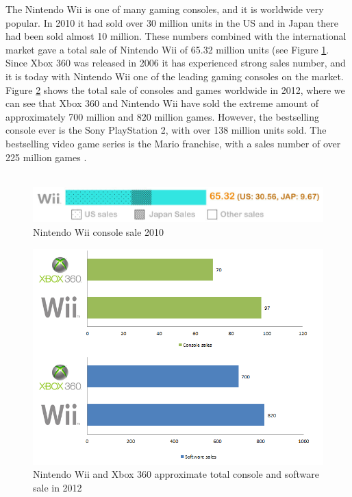 The Nintendo Wii is one of many gaming consoles, and it is worldwide very popular. In 2010 it had sold over 30 million units in the US and in Japan there had been sold almost 10 million. These numbers combined with the international market gave a total sale of Nintendo Wii of 65.32 million units (see Figure \ref{fig:ConsoleWarWii}. Since Xbox 360 was released in 2006 it has experienced strong sales number, and it is today with Nintendo Wii one of the leading gaming consoles on the market. Figure \ref{fig:XboxWiiSales} shows the total sale of consoles and games worldwide in 2012, where we can see that Xbox 360 and Nintendo Wii have sold the extreme amount of approximately 700 million and 820 million games. However, the bestselling console ever is the Sony PlayStation 2, with over 138 million units sold. The bestselling video game series is the Mario franchise, with a sales number of over 225 million games \cite{statistics2012}. \\ \\

\begin{figure}[h!]
\begin{center}
\includegraphics[scale=0.5]{consolewarwii}
\caption[Nitendo Wii console sale]{Nintendo Wii console sale 2010 \cite{statistics2012}}
\label{fig:ConsoleWarWii}
\end{center}
\end{figure}

\begin{figure}[h!]
\begin{center}
\includegraphics[scale=0.7]{xboxwiisales}
\caption[Nitendo Wii and Xbox 360 sales]{Nintendo Wii and Xbox 360 approximate total console and software sale in 2012 \cite{nintendolife} \cite{microsoftxbox} \cite{vgchartzxbox} \cite{vgchartzwii} \cite{vgchartzhardware}}
\label{fig:XboxWiiSales}
\end{center}
\end{figure}

